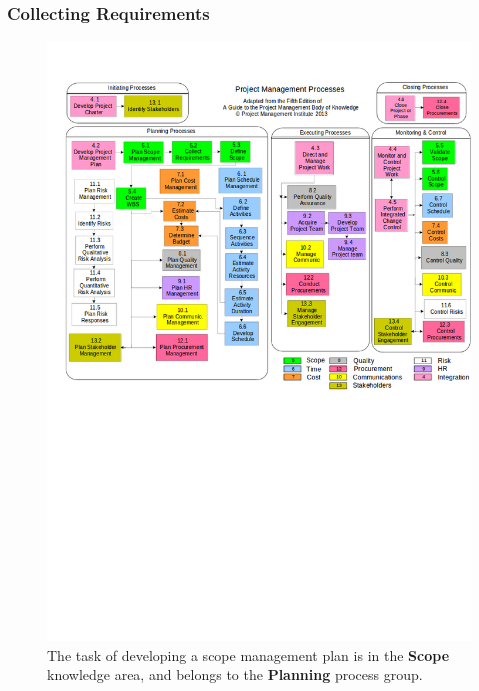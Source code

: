\documentclass[aspectratio=169]{beamer}
\begin{document}
\begin{frame}
\frametitle{Collecting Requirements}
\vspace{-0.5cm}
\begin{figure}
\caption{The task of developing a scope management plan is in the \textbf{Scope} knowledge area, and belongs to the \textbf{Planning} process group.}
\vspace{-0.8cm}
\includegraphics[scale=0.3]{mapping}
\end{figure}
\end{frame}

\end{document}
